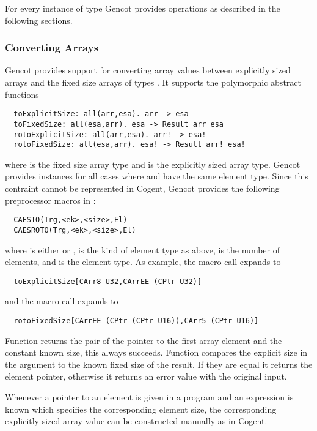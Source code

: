 For every instance of type  Gencot provides operations as described in the following sections.

\subsubsection{Converting Arrays}

Gencot provides support for converting array values between explicitly sized arrays and the fixed size arrays of types
. It supports the polymorphic abstract functions
\begin{verbatim}
  toExplicitSize: all(arr,esa). arr -> esa
  toFixedSize: all(esa,arr). esa -> Result arr esa
  rotoExplicitSize: all(arr,esa). arr! -> esa!
  rotoFixedSize: all(esa,arr). esa! -> Result arr! esa!
\end{verbatim}
where  is the fixed size array type and  is the explicitly sized array type. Gencot provides instances
for all cases where  and  have the same element type. Since this contraint cannot be represented in
Cogent, Gencot provides the following preprocessor macros in :
\begin{verbatim}
  CAESTO(Trg,<ek>,<size>,El)
  CAESROTO(Trg,<ek>,<size>,El)
\end{verbatim}
where  is either  or ,  is the kind of element type as above,  is the 
number of elements, and  is the element type. As example, the macro call  expands to
\begin{verbatim}
  toExplicitSize[CArr8 U32,CArrEE (CPtr U32)]
\end{verbatim}
and the macro call  expands to
\begin{verbatim}
  rotoFixedSize[CArrEE (CPtr (CPtr U16)),CArr5 (CPtr U16)]
\end{verbatim}

Function  returns the pair of the pointer to the first array element and the constant known size, this
always succeeds. Function  compares the explicit size in the argument to the known fixed size of the result.
If they are equal it returns the element pointer, otherwise it returns an error value with the original input.

Whenever a pointer  to an element is given in a program and an expression  is known which specifies the corresponding
element size, the corresponding explicitly sized array value can be constructed manually as  in Cogent.

